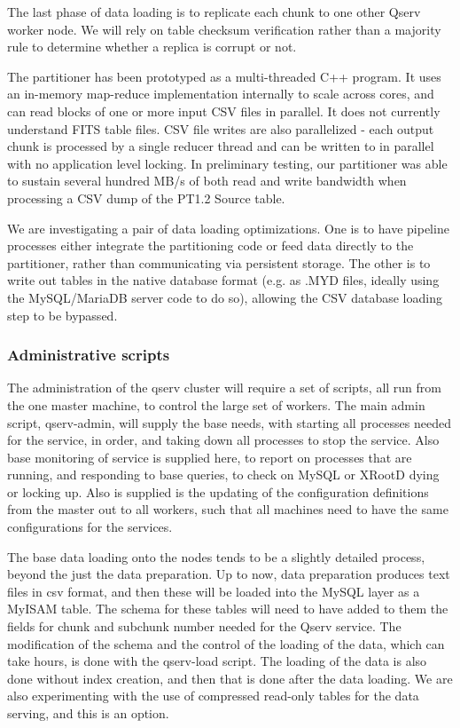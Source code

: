 \documentclass[DM,lsstdraft,toc]{lsstdoc}
\begin{document}
The last phase of data loading is to replicate each chunk to one other
Qserv worker node. We will rely on table checksum verification rather
than a majority rule to determine whether a replica is corrupt or not.

The partitioner has been prototyped as a multi-threaded C++ program. It
uses an in-memory map-reduce implementation internally to scale across
cores, and can read blocks of one or more input CSV files in parallel.
It does not currently understand FITS table files. CSV file writes are
also parallelized - each output chunk is processed by a single reducer
thread and can be written to in parallel with no application level
locking. In preliminary testing, our partitioner was able to sustain
several hundred MB/s of both read and write bandwidth when processing a
CSV dump of the PT1.2 Source table.

We are investigating a pair of data loading optimizations. One is to
have pipeline processes either integrate the partitioning code or feed
data directly to the partitioner, rather than communicating via
persistent storage. The other is to write out tables in the native
database format (e.g. as .MYD files, ideally using the MySQL/MariaDB
server code to do so), allowing the CSV database loading step to be
bypassed.

\subsubsection{Administrative scripts}\label{administrative-scripts}

The administration of the qserv cluster will require a set of scripts,
all run from the one master machine, to control the large set of
workers. The main admin script, qserv-admin, will supply the base needs,
with starting all processes needed for the service, in order, and taking
down all processes to stop the service. Also base monitoring of service
is supplied here, to report on processes that are running, and
responding to base queries, to check on MySQL or
XRootD dying or locking up. Also is supplied
is the updating of the configuration definitions from the master out to
all workers, such that all machines need to have the same configurations
for the services.

The base data loading onto the nodes tends to be a slightly detailed
process, beyond the just the data preparation. Up to now, data
preparation produces text files in csv format, and then these will be
loaded into the MySQL layer as a MyISAM table. The schema for these
tables will need to have added to them the fields for chunk and subchunk
number needed for the Qserv service. The modification of the schema and
the control of the loading of the data, which can take hours, is done
with the qserv-load script. The loading of the data is also done without
index creation, and then that is done after the data loading. We are
also experimenting with the use of compressed read-only tables for the
data serving, and this is an option.
\end{document}
